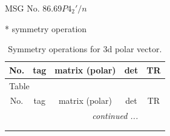 \documentclass[fleqn,8pt]{jsarticle}
\begin{document}
\setcounter{MaxMatrixCols}{32}

\renewcommand{\tablename}{Table~}
\renewcommand{\figurename}{Figure~}
\begin{center}
\LARGE
MSG No. 86.69\quad$P4_{2}'/n$
\end{center}
* symmetry operation
\renewcommand{\arraystretch}{1.3}
\begin{longtable}{ccccc}
\caption{Symmetry operations for 3d polar vector.}
 \\
 \hline \hline
No. & tag & matrix (polar) & det & TR \\ \hline \endfirsthead

\multicolumn{4}{l}{\tablename\ \thetable{}} \\
 \hline \hline
No. & tag & matrix (polar) & det & TR \\ \hline \endhead

 \hline \hline
\multicolumn{4}{r}{\footnotesize\it continued ...} \\ \endfoot

 \hline \hline
\multicolumn{4}{r}{} \\ \endlastfoot


\end{longtable}
\end{document}
